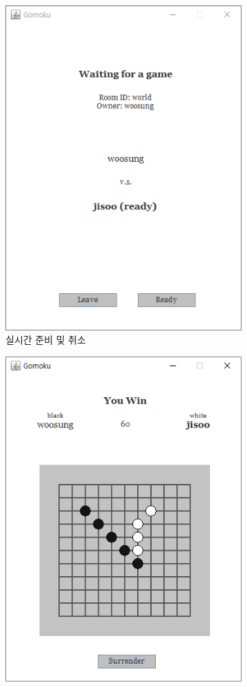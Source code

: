 \documentclass[a4paper, 10pt]{article}
\begin{document}
\begin{figure}[h]
  \centering
  \begin{subfigure}{.3\textwidth}
    \centering
    \includegraphics[width=.8\linewidth]{resource/room}
    \caption{실시간 준비 및 취소}
    \label{fig:ready}
  \end{subfigure}
  \begin{subfigure}{.3\textwidth}
    \centering
    \includegraphics[width=.8\linewidth]{resource/win}

\end{subfigure}
\end{figure}
\end{document}
